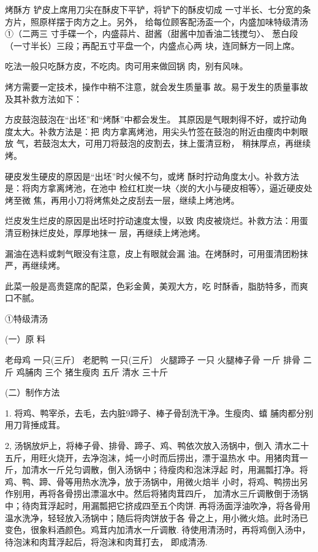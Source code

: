 \begin{recipe}{烤酥方}
\step 铲皮上席用刀尖在酥皮下平铲，将铲下的酥皮切成
一寸半长、七分宽的条方片，照原样摆于肉方之上。另外，
给每位顾客配汤盃一个，内盛加味特级清汤①（二两三
寸手碟一个，内盛蒜片、甜酱（甜酱中加香油二钱搅匀〉、
葱白段（一寸半长）三段；再配五寸平盘一个，内盛点心两 块，连同穌方一同上席。

\step 吃法一般只吃酥方皮，不吃肉。肉可用来做回锅 肉，别有风味。

\notice

烤方需要一定技术，操作中稍不注意，就会发生质量事
故。易于发生的质量事故及其补救方法如下：

\step 方皮鼓泡鼓泡在“出坯”和“烤酥”中都会发生。
其原因是气眼刺得不好，或拧动角度太大。补救方法是：把
肉方拿离烤池，用尖头竹签在鼓泡的附近由痩肉中刺眼放
气，若鼓泡太大，可用刀将鼓泡的皮割去，抹上蛋清豆粉， 稍抹厚点，再继续烤。

\step 硬皮发生硬皮的原因是“出坯”时火候不匀，或烤
酥时拧动角度太小。补救方法是：将肉方拿离烤池，在池中
检红杠炭一块〈炭的大小与硬皮相等〉，逼近硬皮处烤至微
焦，再用小刀将烤焦处之皮刮去一层，继续上烤池烤。

\step 烂皮发生烂皮的原因是出坯时拧动速度太慢，以致
肉皮被烧烂。补救方法：用蛋清豆粉抹烂皮处，厚厚地抹一 层，再继续上烤池烤。

\step 漏油在选料或刺气眼没有注意，皮上有眼就会漏
油。在烤酥时，可用蛋清团粉抹严，再继续烤。

\notes

此菜一般是高贵筵席的配菜，色彩金黄，美观大方，吃
时酥香，脂肪特多，而爽口不腻。

①特级清汤

(一）原 料

老母鸡	一只(三斤〕	老肥鸭	一只(三斤〕
火腿蹄子	一只	火腿棒子骨	一斤
排骨	二斤	鸡脯肉	三个
猪生瘦肉	五斤	清水	三十斤

(二）制作方法

1.	将鸡、鸭宰杀，去毛，去内脏9蹄子、棒子骨刮洗干净。生瘦肉、蟢 脯肉都分别用刀背捶成茸。

2,	汤锅放炉上，将棒子骨、排骨、蹄子、鸡、鸭依次放入汤锅中，倒入 清水二十五斤，用旺火烧开，去净泡沫，炖一小时而后捞出，漂于温热水 中。用猪肉茸一斤，加清水一斤兑匀调散，倒入汤锅中；待瘦肉和泡沫浮起 时，用漏瓢打净。将鸡、鸭、蹄、骨等用热水洗净，放于汤锅中，用微火焙半 小时，将鸡、鸭捞出另作别用，再将各骨捞出漂溫水中。然后将猪肉茸四斤， 加清水三斤调散倒于汤锅中；待肉茸浮起时，用漏瓢把它挤成四至五个肉饼. 再将汤面浮油吹净，将各骨用温水洗净，轻轻放入汤锅中；随后将肉饼放于各 骨之上，用小微火焙。此时汤已变色，很象料酒颜色。鸡茸内加清水一斤调散. 待使用清汤时，再将鸡倒入汤中，待泡沫和肉茸浮起后，将泡沫和肉茸打去， 即成清汤.

\end{recipe}

